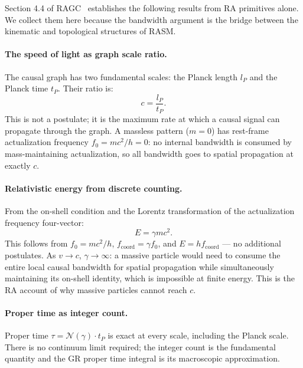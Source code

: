 \documentclass[11pt,a4paper]{article}
\begin{document}
Section 4.4 of RAGC~\citep{Sandeman2026RAGC} establishes the following results
from RA primitives alone. We collect them here because the bandwidth argument
is the bridge between the kinematic and topological structures of RASM.

\paragraph{The speed of light as graph scale ratio.}
The causal graph has two fundamental scales: the Planck length $l_P$ and the
Planck time $t_P$. Their ratio is:
\begin{equation}
  c = \frac{l_P}{t_P}.
  \label{eq:c_native}
\end{equation}
This is not a postulate; it is the maximum rate at which a causal signal can
propagate through the graph. A massless pattern ($m = 0$) has rest-frame
actualization frequency $f_0 = mc^2/h = 0$: no internal bandwidth is consumed
by mass-maintaining actualization, so all bandwidth goes to spatial propagation
at exactly $c$.

\paragraph{Relativistic energy from discrete counting.}
From the on-shell condition and the Lorentz transformation of the actualization
frequency four-vector:
\begin{equation}
  E = \gamma mc^2.
  \label{eq:rel_energy}
\end{equation}
This follows from $f_0 = mc^2/h$, $f_{\mathrm{coord}} = \gamma f_0$, and
$E = hf_{\mathrm{coord}}$ --- no additional postulates. As $v \to c$,
$\gamma \to \infty$: a massive particle would need to consume the entire local
causal bandwidth for spatial propagation while simultaneously maintaining its
on-shell identity, which is impossible at finite energy. This is the RA
account of why massive particles cannot reach $c$.

\paragraph{Proper time as integer count.}
Proper time $\tau = \mathcal{N}(\gamma) \cdot t_P$ is exact at every scale,
including the Planck scale. There is no continuum limit required; the integer
count is the fundamental quantity and the GR proper time integral is its
macroscopic approximation.

\end{document}

